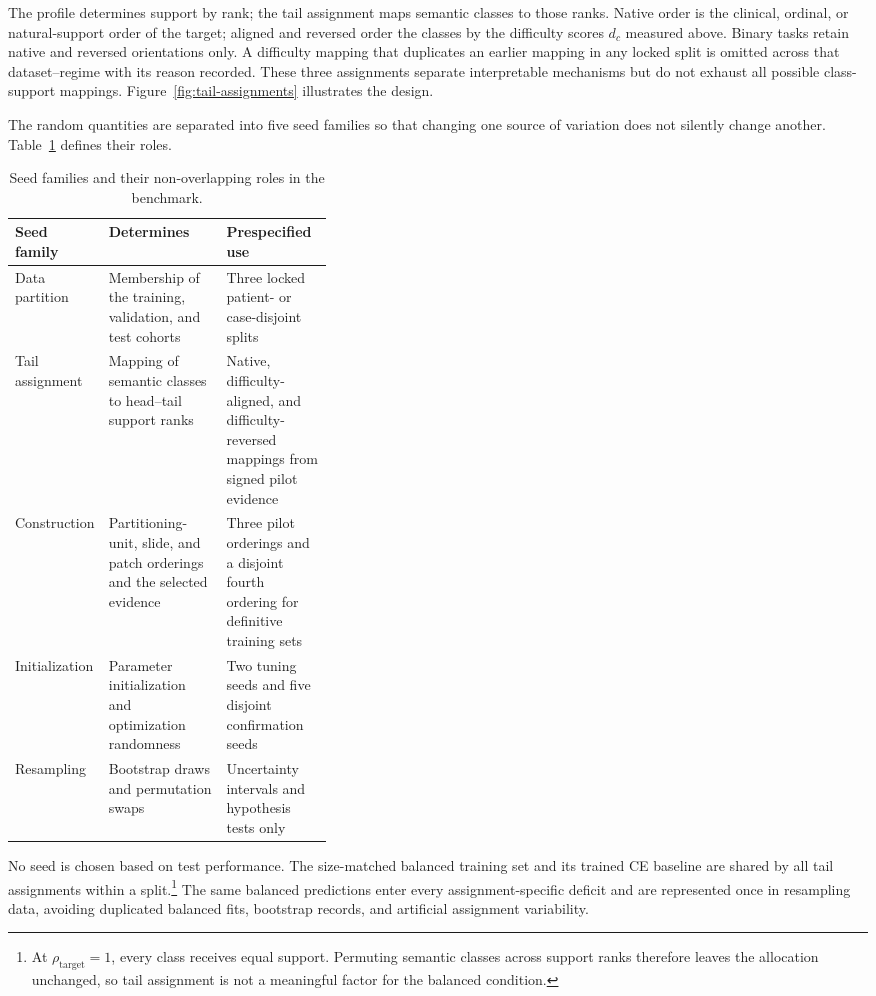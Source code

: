 \documentclass[11pt]{article}
\begin{document}
The profile determines support by rank; the tail assignment maps semantic classes to those ranks. Native order is the clinical, ordinal, or natural-support order of the target; aligned and reversed order the classes by the difficulty scores $d_c$ measured above. Binary tasks retain native and reversed orientations only. A difficulty mapping that duplicates an earlier mapping in any locked split is omitted across that dataset--regime with its reason recorded. These three assignments separate interpretable mechanisms but do not exhaust all possible class-support mappings. Figure~\ref{fig:tail-assignments} illustrates the design.

The random quantities are separated into five seed families so that changing one source of variation does not silently change another. Table~\ref{tab:seed-families} defines their roles.

\begin{table}[H]
  \centering
  \footnotesize
  \begin{tabularx}{\linewidth}{@{}l>{\raggedright\arraybackslash}p{0.37\linewidth}>{\raggedright\arraybackslash}X@{}}
    \toprule
    Seed family & Determines & Prespecified use \\
    \midrule
    Data partition & Membership of the training, validation, and test cohorts & Three locked patient- or case-disjoint splits \\
    Tail assignment & Mapping of semantic classes to head--tail support ranks & Native, difficulty-aligned, and difficulty-reversed mappings from signed pilot evidence \\
    Construction & Partitioning-unit, slide, and patch orderings and the selected evidence & Three pilot orderings and a disjoint fourth ordering for definitive training sets \\
    Initialization & Parameter initialization and optimization randomness & Two tuning seeds and five disjoint confirmation seeds \\
    Resampling & Bootstrap draws and permutation swaps & Uncertainty intervals and hypothesis tests only \\
    \bottomrule
  \end{tabularx}
  \caption{Seed families and their non-overlapping roles in the benchmark.}
  \label{tab:seed-families}
\end{table}

\noindent No seed is chosen based on test performance. The size-matched balanced training set and its trained CE baseline are shared by all tail assignments within a split.\footnote{At $\rho_{\mathrm{target}}=1$, every class receives equal support. Permuting semantic classes across support ranks therefore leaves the allocation unchanged, so tail assignment is not a meaningful factor for the balanced condition.} The same balanced predictions enter every assignment-specific deficit and are represented once in resampling data, avoiding duplicated balanced fits, bootstrap records, and artificial assignment variability.
\end{document}
